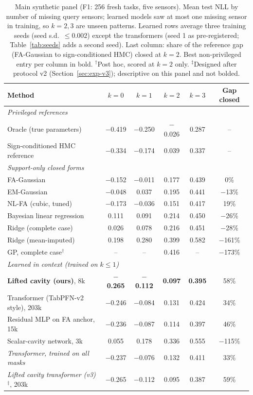 \begin{table}[t]
\centering\small
\caption{\label{tab:main}Main synthetic panel (F1: 256 fresh tasks, five sensors). Mean test NLL by number of missing query sensors; learned models saw at most one missing sensor in training, so $k=2,3$ are unseen patterns. Learned rows average three training seeds (seed s.d.\ $\leq0.002$) except the transformers (seed 1 as pre-registered; Table~\ref{tab:seeds} adds a second seed). Last column: share of the reference gap (FA-Gaussian to sign-conditioned HMC) closed at $k=2$. Best non-privileged entry per column in bold. $^\dagger$Post hoc, scored at $k=2$ only. $^\ddagger$Designed after protocol v2 (Section~\ref{sec:exp-v3}); descriptive on this panel and not bolded.}
\begin{tabular}{lccccc}
\toprule
Method & $k{=}0$ & $k{=}1$ & $k{=}2$ & $k{=}3$ & Gap closed\\
\midrule
\multicolumn{6}{l}{\emph{Privileged references}}\\
Oracle (true parameters) & $-$0.419 & $-$0.250 & $-$0.026 & 0.287 & --\\
Sign-conditioned HMC reference & $-$0.334 & $-$0.174 & 0.039 & 0.337 & --\\
\midrule
\multicolumn{6}{l}{\emph{Support-only closed forms}}\\
FA-Gaussian & $-$0.152 & $-$0.011 & 0.177 & 0.439 & 0\%\\
EM-Gaussian & $-$0.048 & 0.037 & 0.195 & 0.441 & $-$13\%\\
NL-FA (cubic, tuned) & $-$0.173 & $-$0.036 & 0.151 & 0.417 & 19\%\\
Bayesian linear regression & 0.111 & 0.091 & 0.214 & 0.450 & $-$26\%\\
Ridge (complete case) & 0.026 & 0.078 & 0.216 & 0.451 & $-$28\%\\
Ridge (mean-imputed) & 0.198 & 0.280 & 0.399 & 0.582 & $-$161\%\\
GP, complete case$^\dagger$ & -- & -- & 0.416 & -- & $-$173\%\\
\midrule
\multicolumn{6}{l}{\emph{Learned in context (trained on $k\leq1$)}}\\
\textbf{Lifted cavity (ours)}, 8k & \textbf{$-$0.265} & \textbf{$-$0.112} & \textbf{0.097} & \textbf{0.395} & 58\%\\
Transformer (TabPFN-v2 style), 203k & $-$0.246 & $-$0.084 & 0.131 & 0.424 & 34\%\\
Residual MLP on FA anchor, 15k & $-$0.236 & $-$0.087 & 0.114 & 0.397 & 46\%\\
Scalar-cavity network, 3k & 0.055 & 0.178 & 0.336 & 0.555 & $-$115\%\\
\emph{Transformer, trained on all masks} & $-$0.237 & $-$0.076 & 0.132 & 0.411 & 33\%\\
\emph{Lifted cavity transformer (v3)}$^\ddagger$, 203k & $-$0.265 & $-$0.112 & 0.095 & 0.387 & 59\%\\
\bottomrule
\end{tabular}
\end{table}
